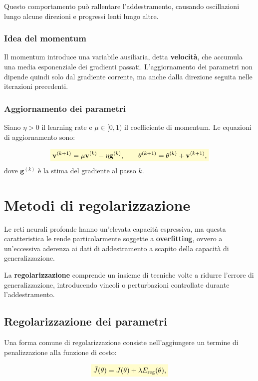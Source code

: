 \documentclass[a4paper,12pt]{report}
\newcommand{\highlight}[1]{%
\colorbox{yellow!20}{$\displaystyle #1$}%
}
\begin{document}
Questo comportamento può rallentare l’addestramento, causando oscillazioni lungo alcune direzioni e progressi lenti lungo altre.

\subsubsection{Idea del momentum}

Il momentum introduce una variabile ausiliaria, detta \textbf{velocità}, che accumula una media esponenziale dei gradienti passati.  
L’aggiornamento dei parametri non dipende quindi solo dal gradiente corrente, ma anche dalla direzione seguita nelle iterazioni precedenti.

\subsubsection{Aggiornamento dei parametri}

Siano $\eta > 0$ il learning rate e $\mu \in [0,1)$ il coefficiente di momentum.  
Le equazioni di aggiornamento sono:

\[
\highlight{
\mathbf{v}^{(k+1)} = \mu \mathbf{v}^{(k)} - \eta \mathbf{g}^{(k)},
\qquad
\theta^{(k+1)} = \theta^{(k)} + \mathbf{v}^{(k+1)},}
\]
dove $\mathbf{g}^{(k)}$ è la stima del gradiente al passo $k$.

\section{Metodi di regolarizzazione}

Le reti neurali profonde hanno un’elevata capacità espressiva, ma questa caratteristica le rende particolarmente soggette a \textbf{overfitting}, ovvero a un’eccessiva aderenza ai dati di addestramento a scapito della capacità di generalizzazione.

La \textbf{regolarizzazione} comprende un insieme di tecniche volte a ridurre l’errore di generalizzazione, introducendo vincoli o perturbazioni controllate durante l’addestramento.

\subsection{Regolarizzazione dei parametri}

Una forma comune di regolarizzazione consiste nell’aggiungere un termine di penalizzazione alla funzione di costo:

\[
\highlight{
\bar{J}(\theta) = J(\theta) + \lambda E_{\text{reg}}(\theta),}
\]
\end{document}

